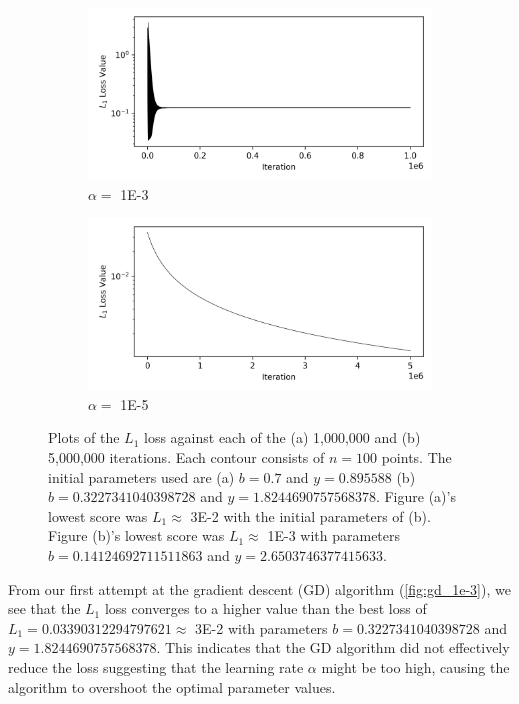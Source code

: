 \documentclass[a4paper]{report}
\begin{document}
\begin{figure}[H]
    \begin{subfigure}{.5\linewidth}
      \includegraphics[width=\linewidth]{images/gd/GD_loss_plot.png}
      \caption{$\alpha =$ 1E-3}
      \label{fig:gd_1e-3}
    \end{subfigure}\hfill
    \begin{subfigure}{.5\linewidth}
      \includegraphics[width=\linewidth]{images/gd/GD_loss_plot2.png}
      \caption{$\alpha =$ 1E-5}
      \label{fig:gd_1e-5}
    \end{subfigure}
    
    \caption{Plots of the $L_1$ loss against each of the (a) 1,000,000 and (b) 5,000,000 iterations. Each contour consists of $n = 100$ points. The initial parameters used are (a) $b = 0.7$ and $y = 0.895588$ (b) $b = 0.3227341040398728$ and $y = 1.8244690757568378$. Figure (a)'s lowest score was $L_1 \approx$ 3E-2 with the initial parameters of (b). Figure (b)'s lowest score was $L_1 \approx$ 1E-3 with parameters $b = 0.14124692711511863$ and $y = 2.6503746377415633$.}
    \label{fig:GD_loss_plots}
\end{figure}

From our first attempt at the gradient descent (GD) algorithm (\autoref{fig:gd_1e-3}), we see that the $L_1$ loss converges to a higher value than the best loss of $L_1 = 0.03390312294797621 \approx$ 3E-2 with parameters $b = 0.3227341040398728$ and $y = 1.8244690757568378$. This indicates that the GD algorithm did not effectively reduce the loss suggesting that the learning rate $\alpha$ might be too high, causing the algorithm  to overshoot the optimal parameter values.
\end{document}
